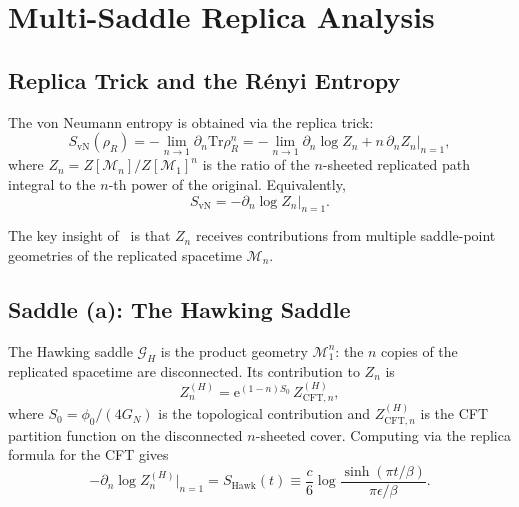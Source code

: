 \documentclass[12pt,a4paper]{article}
\newcommand{\SHawk}{S_{\mathrm{Hawk}}}
\newcommand{\e}{\mathrm{e}}
\newcommand{\Tr}{\mathrm{Tr}}
\newcommand{\Phi}{\phi}  %
\begin{document}
\section{Multi-Saddle Replica Analysis}
\label{sec:replica}

\subsection{Replica Trick and the R\'enyi Entropy}
\label{subsec:replica_trick}

The von Neumann entropy is obtained via the replica trick:
\begin{equation}
  S_{\mathrm{vN}}(\rho_R) = -\lim_{n\to 1}\partial_n \Tr\rho_R^n
    = -\lim_{n\to 1}\partial_n \log Z_n + n\,\partial_n Z_n\big|_{n=1},
\label{eq:replica_trick}
\end{equation}
where $Z_n = Z[\mathcal{M}_n]/Z[\mathcal{M}_1]^n$ is the ratio of the
$n$-sheeted replicated path integral to the $n$-th power of the original.
Equivalently,
\begin{equation}
  S_{\mathrm{vN}} = -\partial_n \log Z_n\Big|_{n=1}.
\label{eq:von_Neumann}
\end{equation}

The key insight of~\cite{Almheiri2019b,Penington2020} is that $Z_n$ receives
contributions from multiple saddle-point geometries of the replicated
spacetime $\mathcal{M}_n$.

\subsection{Saddle (a): The Hawking Saddle}
\label{subsec:hawking_saddle}

The Hawking saddle $\mathcal{G}_H$ is the product geometry $\mathcal{M}_1^n$:
the $n$ copies of the replicated spacetime are disconnected.  Its contribution
to $Z_n$ is
\begin{equation}
  Z_n^{(H)} = \e^{(1-n)S_0}\,Z_{\mathrm{CFT},n}^{(H)},
\label{eq:Z_hawking}
\end{equation}
where $S_0 = \Phi_0/(4G_N)$ is the topological contribution and
$Z_{\mathrm{CFT},n}^{(H)}$ is the CFT partition function on the disconnected
$n$-sheeted cover.  Computing via the replica formula for the CFT gives
\begin{equation}
  -\partial_n \log Z_n^{(H)}\Big|_{n=1}
    = \SHawk(t) \equiv \frac{c}{6}\log\frac{\sinh(\pi t/\beta)}{\pi\epsilon/\beta}.
\label{eq:S_hawking_formula}
\end{equation}
\end{document}
